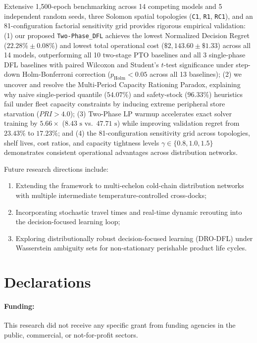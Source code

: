 \documentclass[11pt,a4paper]{article}
\theoremstyle{definition}
\theoremstyle{remark}
\begin{document}
Extensive 1,500-epoch benchmarking across 14 competing models and 5 independent random seeds, three Solomon spatial topologies (\texttt{C1}, \texttt{R1}, \texttt{RC1}), and an 81-configuration factorial sensitivity grid provides rigorous empirical validation: (1) our proposed \texttt{Two-Phase\_DFL} achieves the lowest Normalized Decision Regret ($22.28\% \pm 0.08\%$) and lowest total operational cost ($\$2,143.60 \pm \$1.33$) across all 14 models, outperforming all 10 two-stage PTO baselines and all 3 single-phase DFL baselines with paired Wilcoxon and Student's $t$-test significance under step-down Holm-Bonferroni correction ($p_{\text{Holm}} < 0.05$ across all 13 baselines); (2) we uncover and resolve the Multi-Period Capacity Rationing Paradox, explaining why naive single-period quantile ($54.07\%$) and safety-stock ($96.33\%$) heuristics fail under fleet capacity constraints by inducing extreme peripheral store starvation ($PRI > 4.0$); (3) Two-Phase LP warmup accelerates exact solver training by $5.66\times$ ($8.43\text{ s}$ vs.\ $47.71\text{ s}$) while improving validation regret from $23.43\%$ to $17.23\%$; and (4) the 81-configuration sensitivity grid across topologies, shelf lives, cost ratios, and capacity tightness levels $\gamma \in \{0.8, 1.0, 1.5\}$ demonstrates consistent operational advantages across distribution networks.

Future research directions include:
\begin{enumerate}[label=(\roman*)]
    \item Extending the framework to multi-echelon cold-chain distribution networks with multiple intermediate temperature-controlled cross-docks;
    \item Incorporating stochastic travel times and real-time dynamic rerouting into the decision-focused learning loop;
    \item Exploring distributionally robust decision-focused learning (DRO-DFL) under Wasserstein ambiguity sets for non-stationary perishable product life cycles.
\end{enumerate}

\section*{Declarations}

\paragraph{Funding:} This research did not receive any specific grant from funding agencies in the public, commercial, or not-for-profit sectors.
\end{document}
